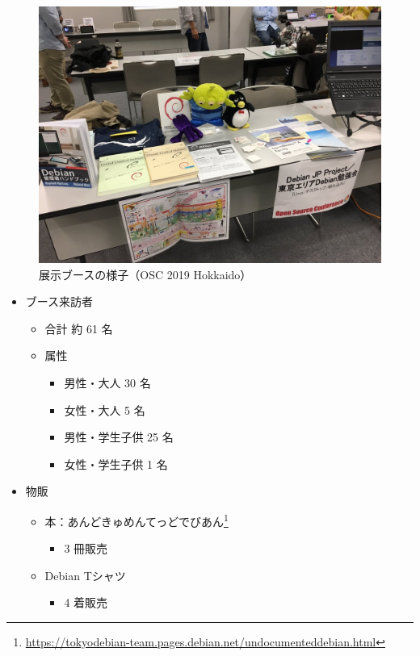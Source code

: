 \documentclass[mingoth,a4paper]{jsarticle}
\begin{document}
\begin{figure}[H]
  \begin{center}
    \includegraphics[width=12cm]{image201906/debianjp-booth_osc2019do.png}
    \caption{展示ブースの様子（OSC 2019 Hokkaido）}
    \label{fig:booth-osc2019do}
  \end{center}
\end{figure}

\begin{itemize}
\item ブース来訪者
  \begin{itemize}
  \item 合計 約 61 名
  \item 属性
    \begin{itemize}
    \item 男性・大人     30 名
    \item 女性・大人      5 名
    \item 男性・学生子供 25 名
    \item 女性・学生子供  1 名
    \end{itemize}
  \end{itemize}
\end{itemize}

\begin{itemize}
\item 物販
  \begin{itemize}
  \item 本：あんどきゅめんてっどでびあん\footnote{\url{https://tokyodebian-team.pages.debian.net/undocumenteddebian.html}}
    \begin{itemize}
    \item 3 冊販売
    \end{itemize}
  \item Debian Tシャツ
    \begin{itemize}
    \item 4 着販売
    \end{itemize}
  \end{itemize}
\end{itemize}
\end{document}
